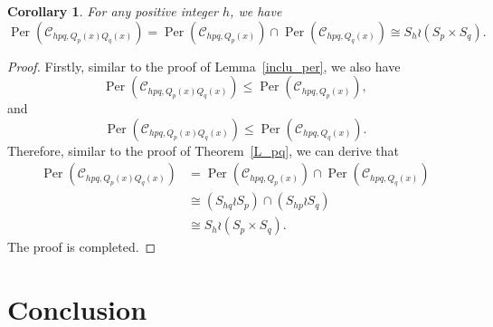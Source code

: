 \documentclass[journal,12pt,onecolumn]{IEEEtran}
\newtheorem{corollary}[theorem]{Corollary}
\begin{document}
 
\begin{corollary}\label{L_pq_col}
    For any positive integer $h$, we have
    \[
        \operatorname{Per}(\mathcal{C}_{hpq,Q_p(x)Q_q(x)}) = \operatorname{Per}(\mathcal{C}_{hpq,Q_p(x)})\cap\operatorname{Per}(\mathcal{C}_{hpq,Q_q(x)})\cong S_h\wr(S_p\times S_q).
    \]
\end{corollary}
\begin{proof}
    Firstly, similar to the proof of Lemma~\ref{inclu_per}, we also have
    \[
        \operatorname{Per}(\mathcal{C}_{hpq,Q_p(x)Q_q(x)})\leqslant \operatorname{Per}(\mathcal{C}_{hpq,Q_p(x)}),
    \]
    and 
    \[
        \operatorname{Per}(\mathcal{C}_{hpq,Q_p(x)Q_q(x)})\leqslant \operatorname{Per}(\mathcal{C}_{hpq,Q_q(x)}). 
    \]
    Therefore, similar to the proof of Theorem~\ref{L_pq}, we can derive that
    \begin{align*}
       \operatorname{Per}(\mathcal{C}_{hpq,Q_p(x)Q_q(x)}) &= \operatorname{Per}(\mathcal{C}_{hpq,Q_p(x)})\cap \operatorname{Per}(\mathcal{C}_{hpq,Q_q(x)}) \\
        &\cong (S_{hq} \wr S_p)\cap(S_{hp} \wr S_q) \\
        &\cong S_h \wr (S_p\times S_q). 
    \end{align*}
    The proof is completed. 
\end{proof}



\section{Conclusion}\label{Con}
\end{document}
